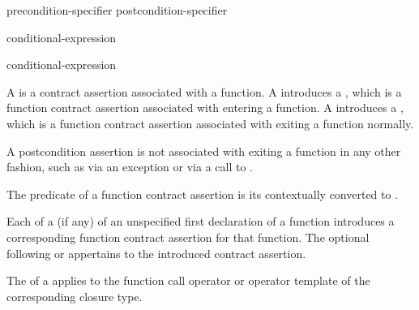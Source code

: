 \begin{bnf}
\br
  precondition-specifier\br
  postcondition-specifier
\end{bnf}

\begin{bnf}
\br
    \terminal{(} conditional-expression \terminal{)}
\end{bnf}

\begin{bnf}
\br
    \terminal{(}  conditional-expression \terminal{)}
\end{bnf}

\pnum
{}
A 
is a contract assertion
associated with a function.
A 
introduces a ,
which is a function contract assertion
associated with entering a function.
A 
introduces a ,
which is a function contract assertion
associated with exiting a function normally.
\begin{note}
A postcondition assertion
is not associated with exiting a function
in any other fashion,
such as via an exception
or via a call to .
\end{note}

\pnum
The predicate
of a function contract assertion
is its 
contextually converted to .

\pnum
Each 
of a  (if any)
of an unspecified first declaration
of a function
introduces a corresponding function contract assertion for that function.
The optional 
following  or 
appertains to the introduced contract assertion.
\begin{note}
The 
of a 
applies to the function call operator or operator template
of the corresponding closure type.
\end{note}

